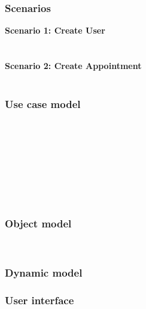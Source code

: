 \subsubsection{Scenarios}
\textbf{Scenario 1: Create User} \\
	\\\\
\textbf{Scenario 2: Create Appointment} \\
	\\


\subsubsection{Use case model}
	
	\begin{center}	
		\\[1in]
		\\
		\\[1in]
		\\
		\\[1in]
		\\
		\\
	\end{center}
\subsubsection{Object model}
		\\[1in]
		
		
	

\subsubsection{Dynamic model}
\subsubsection{User interface}